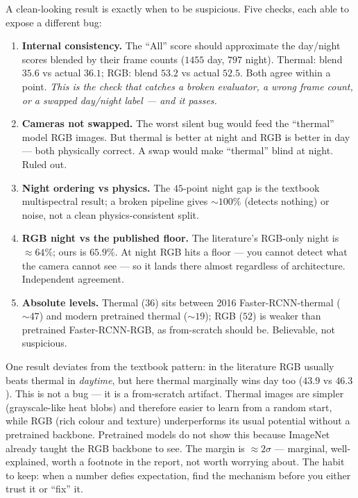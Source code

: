 \documentclass[../main.tex]{subfiles}
\begin{document}
A clean-looking result is exactly when to be suspicious. Five checks, each able to expose a
different bug:

\begin{enumerate}
  \item \textbf{Internal consistency.} The ``All'' score should approximate the day/night scores
        blended by their frame counts ($1455$ day, $797$ night). Thermal: blend $35.6$ vs actual
        $36.1$; RGB: blend $53.2$ vs actual $52.5$. Both agree within a point. \emph{This is the
        check that catches a broken evaluator, a wrong frame count, or a swapped day/night label ---
        and it passes.}
  \item \textbf{Cameras not swapped.} The worst silent bug would feed the ``thermal'' model RGB
        images. But thermal is better at night and RGB is better in day --- both physically correct.
        A swap would make ``thermal'' blind at night. Ruled out.
  \item \textbf{Night ordering vs physics.} The $45$-point night gap is the textbook multispectral
        result; a broken pipeline gives $\sim100\%$ (detects nothing) or noise, not a clean
        physics-consistent split.
  \item \textbf{RGB night vs the published floor.} The literature's RGB-only night is $\approx 64\%$;
        ours is $65.9\%$. At night RGB hits a floor --- you cannot detect what the camera cannot see
        --- so it lands there almost regardless of architecture. Independent agreement.
  \item \textbf{Absolute levels.} Thermal ($36$) sits between 2016 Faster-RCNN-thermal ($\sim47$)
        and modern pretrained thermal ($\sim19$); RGB ($52$) is weaker than pretrained
        Faster-RCNN-RGB, as from-scratch should be. Believable, not suspicious.
\end{enumerate}

\begin{lesson}
One result deviates from the textbook pattern: in the literature RGB usually beats thermal in
\emph{daytime}, but here thermal marginally wins day too ($43.9$ vs $46.3$). This is not a bug --- it
is a from-scratch artifact. Thermal images are simpler (grayscale-like heat blobs) and therefore
easier to learn from a random start, while RGB (rich colour and texture) underperforms its usual
potential without a pretrained backbone. Pretrained models do not show this because ImageNet already
taught the RGB backbone to see. The margin is $\approx 2\sigma$ --- marginal, well-explained, worth
a footnote in the report, not worth worrying about. The habit to keep: when a number defies
expectation, find the mechanism before you either trust it or ``fix'' it.
\end{lesson}
\end{document}
